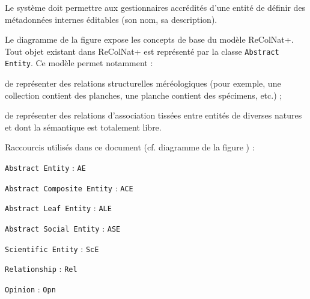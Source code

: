 \startsubsubsection[title={Métadonnées internes éditables}]

\exig{}
Le système doit permettre aux gestionnaires accrédités d'une entité de définir des métadonnées internes éditables (son nom, sa description).

\startsection[title={Éléments de modélisation}]

Le diagramme de la figure  expose les concepts de base du modèle ReColNat+.
Tout objet existant dans ReColNat+ est représenté par la classe {\tt Abstract Entity}.
Ce modèle permet notamment :

\startitemize
	\item
	de représenter des relations structurelles méréologiques (pour exemple, une collection contient des planches, une planche contient des spécimens, etc.) ;
	\item
	de représenter des relations d'association tissées entre entités de diverses natures et dont la sémantique est totalement libre.
\stopitemize


Raccourcis utilisés dans ce document (cf. diagramme de la figure ) :

\startitemize
	\item {\tt Abstract Entity} : {\tt AE}
	\item {\tt Abstract Composite Entity} : {\tt ACE}
	\item {\tt Abstract Leaf Entity} : {\tt ALE}
	\item {\tt Abstract Social Entity} : {\tt ASE}
	\item {\tt Scientific Entity} : {\tt ScE}
	\item {\tt Relationship} : {\tt Rel}
	\item {\tt Opinion} : {\tt Opn}
\stopitemize